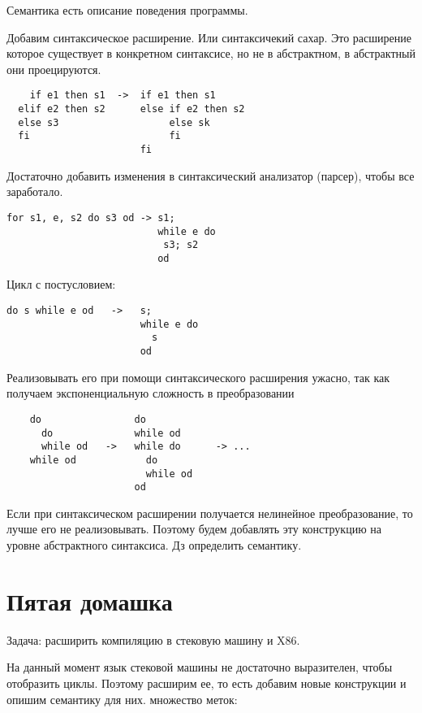 
Семантика есть описание поведения программы.

Добавим синтаксическое расширение. Или синтаксичекий сахар. Это расширение
которое существует в конкретном синтаксисе, но не в абстрактном, в абстрактный
они проецируются.

\begin{verbatim}
    if e1 then s1  ->  if e1 then s1
  elif e2 then s2      else if e2 then s2
  else s3                   else sk
  fi                        fi
                       fi
\end{verbatim}

Достаточно добавить изменения в синтаксический анализатор (парсер), чтобы все
заработало.

\begin{verbatim}
for s1, e, s2 do s3 od -> s1;
                          while e do
                           s3; s2
                          od
\end{verbatim}

Цикл с постусловием:

\begin{verbatim}
do s while e od   ->   s;
                       while e do
                         s
                       od
\end{verbatim}

Реализовывать его при помощи синтаксического расширения ужасно, так как
получаем экспоненциальную сложность в преобразовании

\begin{verbatim}
    do                do
      do              while od
      while od   ->   while do      -> ...
    while od            do
                        while od
                      od
\end{verbatim}

Если при синтаксическом расширении получается нелинейное преобразование, то
лучше его не реализовывать. Поэтому будем добавлять эту конструкцию на уровне
абстрактного синтаксиса. Дз определить семантику.

\section{Пятая домашка}

Задача: расширить компиляцию в стековую машину и X86.

На данный момент язык стековой машины не достаточно выразителен, чтобы
отобразить циклы. Поэтому расширим ее, то есть добавим новые конструкции и
опишим семантику для них.
множество меток:

